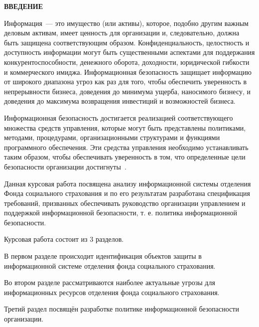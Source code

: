 \newpage

\begin{center}
  \Large{\textbf{ВВЕДЕНИЕ}}
\end{center}

Информация~--- это имущество (или активы), которое, подобно другим
важным деловым активам, имеет ценность для организации и,
следовательно, должна быть защищена соответствующим
образом. Конфиденциальность, целостность и доступность информации
могут быть существенными аспектами для поддержания
конкурентоспособности, денежного оборота, доходности, юридической
гибкости и коммерческого имиджа. Информационная безопасность защищает
информацию от широкого диапазона угроз как раз для того, чтобы
обеспечить уверенность в непрерывности бизнеса, доведения до минимума
ущерба, наносимого бизнесу, и доведения до максимума возвращения
инвестиций и возможностей бизнеса.

Информационная безопасность достигается реализацией соответствующего
множества средств управления, которые могут быть представлены
политиками, методами, процедурами, организационными структурами и
функциями программного обеспечения. Эти средства управления необходимо
устанавливать таким образом, чтобы обеспечивать уверенность в том, что
определенные цели безопасности организации достигнуты~\cite{1}.

Данная курсовая работа посвящена анализу информационной системы
отделения Фонда социального страхования и по его результатам
разработана спецификация требований, призванных обеспечивать
руководство организации управлением и поддержкой информационной
безопасности, т. е. политика информационной безопасности.

Курсовая работа состоит из 3 разделов.

В первом разделе происходит идентификация объектов защиты в
информационной системе отделения фонда социального страхования.

Во втором разделе рассматриваются наиболее актуальные угрозы для
информационных ресурсов отделения фонда социального страхования.

Третий раздел посвящён разработке политике информационной безопасности
организации.

\newpage
